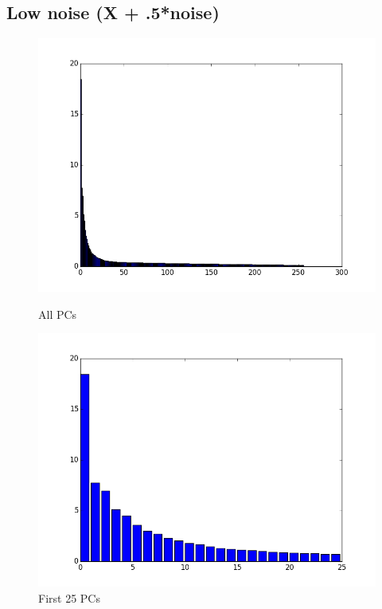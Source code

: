\documentclass[a4paper,11pt]{article}
\begin{document}
\subsection*{Low noise (X + .5*noise)}
\begin{figure}[H]

  \includegraphics[width=\linewidth]{5_b_a_05.png}
  \caption{All PCs}\label{fig:awesome_image1}
\endminipage\hfill
{}
  \includegraphics[width=\linewidth]{5_b_b_05.png}
  \caption{First 25 PCs}\label{fig:awesome_image2}
\endminipage\hfill
{}%

\end{figure}
\end{document}

